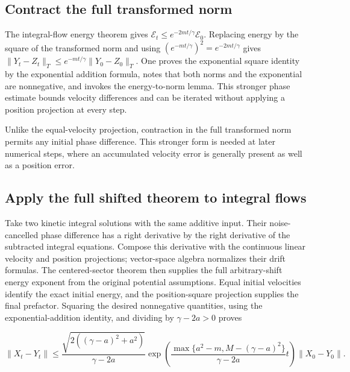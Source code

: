 \documentclass[11pt,a4paper]{report}
\begin{document}
\subsection{\texorpdfstring{Contract the full transformed norm}{Contract the full transformed norm}}
\label{report-step-KineticLangevin-SynchronousFlow-lean-3}


The integral-flow energy theorem gives \(\mathcal E_t\le e^{-2mt/\gamma}\mathcal E_0\). Replacing energy by the square of the transformed norm and using \((e^{-mt/\gamma})^2=e^{-2mt/\gamma}\) gives \(\|Y_t-Z_t\|_T\le e^{-mt/\gamma}\|Y_0-Z_0\|_T\). One proves the exponential square identity by the exponential addition formula, notes that both norms and the exponential are nonnegative, and invokes the energy-to-norm lemma. This stronger phase estimate bounds velocity differences and can be iterated without applying a position projection at every step.



Unlike the equal-velocity projection, contraction in the full transformed norm permits any initial phase difference. This stronger form is needed at later numerical steps, where an accumulated velocity error is generally present as well as a position error.

\subsection{\texorpdfstring{Apply the full shifted theorem to integral flows}{Apply the full shifted theorem to integral flows}}
\label{report-step-KineticLangevin-SynchronousFlow-lean-4}


Take two kinetic integral solutions with the same additive input. Their noise-cancelled phase difference has a right derivative by the right derivative of the subtracted integral equations. Compose this derivative with the continuous linear velocity and position projections; vector-space algebra normalizes their drift formulas. The centered-sector theorem then supplies the full arbitrary-shift energy exponent from the original potential assumptions. Equal initial velocities identify the exact initial energy, and the position-square projection supplies the final prefactor. Squaring the desired nonnegative quantities, using the exponential-addition identity, and dividing by \(\gamma-2a>0\) proves

\[\|X_t-Y_t\|\le\frac{\sqrt{2((\gamma-a)^2+a^2)}}{\gamma-2a}\exp\!\left(\frac{\max\{a^2-m,M-(\gamma-a)^2\}}{\gamma-2a}t\right)\|X_0-Y_0\|.\]
\end{document}
